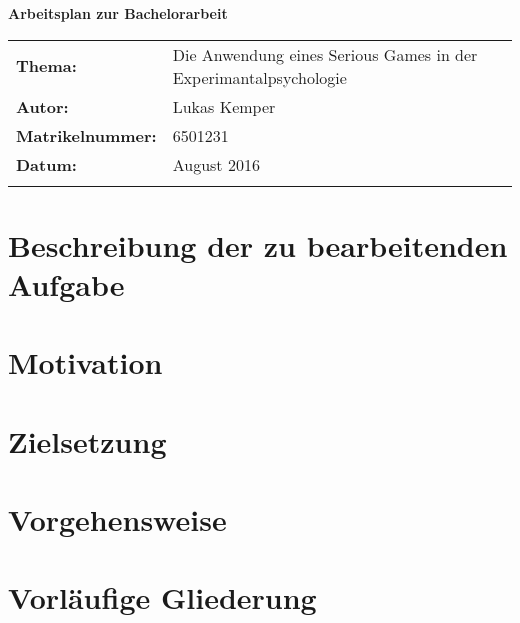 \documentclass[ngermant]{scrartcl}
\newcommand{\Name}{Lukas Kemper}
\newcommand{\Art}{Bachelorarbeit}
\newcommand{\Matrikelnummer}{6501231}
\newcommand{\Datum}{August 2016}
\begin{document}
 

\thispagestyle{ErsteSeite} 

    {\Large\bfseries Arbeitsplan zur \Art\par} 
    \vspace{1em} 
    
    \begin{tabular}{lp{11.8cm}} 
     \rule{0pt}{18pt} 	\textbf{Thema:}   			 & 	Die Anwendung eines Serious Games in der Experimantalpsychologie                \\ 
     \rule{0pt}{18pt}	\textbf{Autor:}    			& 	\Name        \\ 
     \rule{0pt}{18pt}	\textbf{Matrikelnummer:}    	&  	\Matrikelnummer \\ 
     \rule{0pt}{18pt}	\textbf{Datum:}          	 	&	\Datum \\
    \begin{minipage}{.3\textwidth}
    \end{minipage}
    \end{tabular} 
    \par\par\par

    
\section{Beschreibung der zu bearbeitenden Aufgabe}
\label{sec:Aufgabe}


\section{Motivation}
\label{sec:Motivation}


\section{Zielsetzung}
\label{sec:Zielsetzung}


\section{Vorgehensweise}
\label{sec:Vorgehensweise}



\section{Vorläufige Gliederung}
\label{sec:Gliederung}

\clearpage
\end{document}
